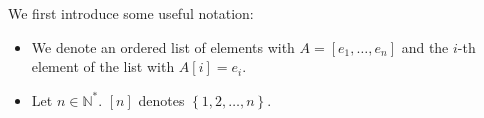 We first introduce some useful notation:
\begin{itemize}
  \item We denote an ordered list of elements with $A = \left[e_1, \dots,
  e_n\right]$ and the $i$-th element of the list with $A\left[i\right] = e_i$.
  \item Let $n \in \mathbb{N}^*$. $\left[n\right]$ denotes $\left\{1, 2, \dots,
  n\right\}$.
\end{itemize}

